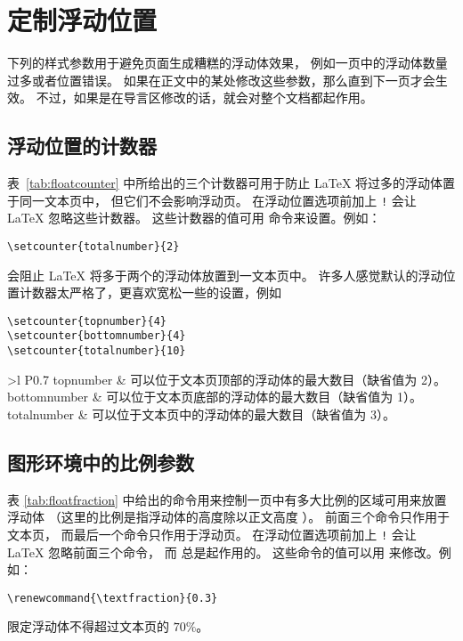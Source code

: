 \section{定制浮动位置}\label{sec:typerule}

下列的样式参数用于避免页面生成糟糕的浮动体效果，
例如一页中的浮动体数量过多或者位置错误。
如果在正文中的某处修改这些参数，那么直到下一页才会生效。
不过，如果是在导言区修改的话，就会对整个文档都起作用。

\subsection{浮动位置的计数器}

表~\ref{tab:floatcounter} 中所给出的三个计数器可用于防止 \LaTeX{} 将过多的浮动体置于同一文本页中，
但它们不会影响浮动页。
在浮动位置选项前加上 \texttt{!} 会让 \LaTeX{} 忽略这些计数器。
这些计数器的值可用  命令来设置。例如：
\begin{lstlisting}
\setcounter{totalnumber}{2}
\end{lstlisting}
会阻止 \LaTeX{} 将多于两个的浮动体放置到一文本页中。
许多人感觉默认的浮动位置计数器太严格了，更喜欢宽松一些的设置，例如
\begin{lstlisting}
\setcounter{topnumber}{4}
\setcounter{bottomnumber}{4}
\setcounter{totalnumber}{10}
\end{lstlisting}

\begin{table}[htp]
	\centering\kaishu
	\caption{浮动位置计数器}\label{tab:floatcounter}
	\begin{tabular}{>{\ttfamily}l P{0.7\textwidth} }
		\toprule
		topnumber & 可以位于文本页顶部的浮动体的最大数目（缺省值为 2）。\\
		\hline
		bottomnumber & 可以位于文本页底部的浮动体的最大数目（缺省值为 1）。\\
		\hline
		totalnumber & 可以位于文本页中的浮动体的最大数目（缺省值为 3）。 \\
		\bottomrule
	\end{tabular}
\end{table}

\subsection{图形环境中的比例参数}\label{ssec:figpara}

表 \ref{tab:floatfraction} 中给出的命令用来控制一页中有多大比例的区域可用来放置浮动体
（这里的比例是指浮动体的高度除以正文高度 ）。
前面三个命令只作用于文本页，
而最后一个命令只作用于浮动页。
在浮动位置选项前加上 \texttt{!} 会让 \LaTeX{} 忽略前面三个命令，
而  总是起作用的。
这些命令的值可以用  来修改。例如：
\begin{lstlisting}
\renewcommand{\textfraction}{0.3}
\end{lstlisting}
限定浮动体不得超过文本页的 $70\percent$。


